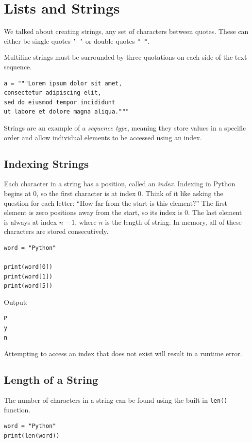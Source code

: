 \section{Lists and Strings}
We talked about creating strings, any set of characters between quotes. These can either be single quotes \texttt{' '} or double quotes \texttt{"   "}. 

Multiline strings must be surrounded by three quotations on each side of the text sequence. 
\begin{verbatim}
a = """Lorem ipsum dolor sit amet,
consectetur adipiscing elit,
sed do eiusmod tempor incididunt
ut labore et dolore magna aliqua."""
\end{verbatim}

Strings are an example of a \emph{sequence type}, meaning they store values in a
specific order and allow individual elements to be accessed using an index.

\subsection{Indexing Strings}
Each character in a string has a position, called an \emph{index}. Indexing in
Python begins at 0, so the first character is at index 0. Think of it like asking the question for each letter: ``How far from the start is this element?'' The first element is zero positions away from the start, so its index is 0. The last element is always at index $n-1$, where $n$ is the length of string. In memory, all of these characters are stored consecutively. 

\begin{verbatim}
word = "Python"

print(word[0])
print(word[1])
print(word[5])
\end{verbatim}
Output:
\begin{verbatim}
P
y
n
\end{verbatim}
Attempting to access an index that does not exist will result in a runtime error.

\subsection{Length of a String}
The number of characters in a string can be found using the built-in
\texttt{len()} function.

\begin{verbatim}
word = "Python"
print(len(word))
\end{verbatim}


